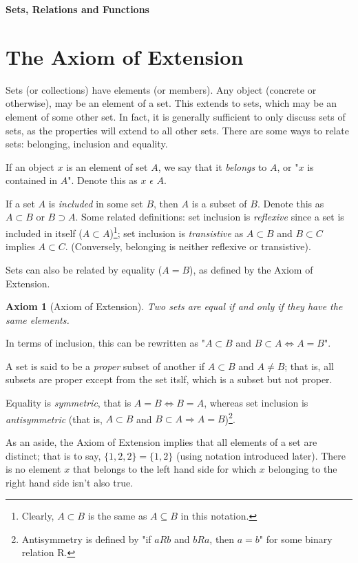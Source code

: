 \documentclass[12pt]{article}
\newtheorem{axiom}{Axiom}
\begin{document}
\begin{center}\LARGE\bf
    Sets, Relations and Functions
\end{center}

\section{The Axiom of Extension}
Sets (or collections) have elements (or members). Any object (concrete or otherwise), may be an element
of a set. This extends to sets, which may be an element of some other set. In fact, it is generally sufficient
to only discuss sets of sets, as the properties will extend to all other sets. There are some ways to relate sets: belonging, inclusion and equality.

If an object $x$ is an element of set $A$, we say that it \textit{belongs} to $A$, or "$x$ is contained
in $A$". Denote this as $x$ $\epsilon$ $A$.

If a set $A$ is \textit{included} in some set $B$, then $A$ is a subset of $B$. Denote this as $A \subset B$ or
$B \supset A$. Some related definitions: set inclusion is \textit{reflexive} since a set is included in
itself ($A \subset A$)\footnote{Clearly, $A \subset B$ is the same as $A \subseteq B$ in this notation.}; set inclusion is \textit{transistive} as $A \subset B$ and $B \subset C$ implies
$A \subset C$. (Conversely, belonging is neither reflexive or transistive).

Sets can also be related by equality ($A = B$), as defined by the Axiom of Extension.
\begin{axiom}[Axiom of Extension]
    Two sets are equal if and only if they have the same elements.
\end{axiom}
In terms of  inclusion, this can be rewritten as "$A \subset B$ and $B \subset A \Leftrightarrow A = B$".

A set is said to be a \textit{proper} subset of another if $A \subset B$ and $A \neq B$; that is, all
subsets are proper except from the set itslf, which is a subset but not proper.

Equality is \textit{symmetric}, that is $A = B \Leftrightarrow B = A$, whereas set inclusion is \textit{antisymmetric}
(that is, $A \subset B$ and $B \subset A \Rightarrow A = B$)\footnote{Antisymmetry is defined by "if $aRb$ and $bRa$, then $a = b$" for
some binary relation R.}.

As an aside, the Axiom of Extension implies that all elements of a set are distinct; that is to say, $\{1, 2, 2\} = \{1, 2\}$ (using notation
introduced later). There is no element $x$ that belongs to the left hand side for which $x$ belonging to the right hand side isn't
also true.
\end{document}
